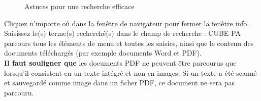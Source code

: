 \begin{figure}[H]
\caption{Astuces pour une recherche efficace}
\end{figure}

Cliquez n'importe où dans la fenêtre de navigateur pour fermer la fenêtre info. Saisissez le(s) terme(s) recherché(s) dans le champ de recherche . CUBE PA parcours tous les éléments de menu et toutes les saisies, ainsi que le contenu des documents téléchargés (par exemple documents Word et PDF). \\

\textbf{Il faut souligner que} les documents PDF ne peuvent être parcourus que lorsqu'il consistent en un texte intégré et non en images. Si un texte a été scanné et sauvegardé comme image dans un ficher PDF, ce document ne sera pas parcouru. \\

